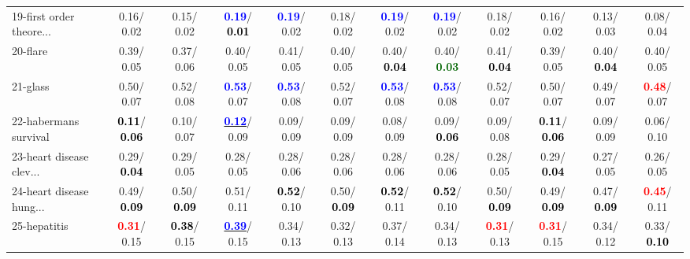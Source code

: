 \begin{table}[h]
\begin{center}
{\begin{tabular}{lc|c|c|c|c|c|c|c|c|c|c}
19-first order theore... &   0.16/  0.02 &   0.15/  0.02 & \textcolor{blue}{\textbf{  0.19}}/\textcolor{black}{\textbf{  0.01}} & \textcolor{blue}{\textbf{  0.19}}/  0.02 &   0.18/  0.02 & \textcolor{blue}{\textbf{  0.19}}/  0.02 & \textcolor{blue}{\textbf{  0.19}}/  0.02 &   0.18/  0.02 &   0.16/  0.02 &   0.13/  0.03 &   0.08/  0.04 \\
20-flare &   0.39/  0.05 &   0.37/  0.06 &   0.40/  0.05 &   0.41/  0.05 &   0.40/  0.05 &   0.40/\textcolor{black}{\textbf{  0.04}} &   0.40/\textcolor{darkgreen}{\textbf{  0.03}} &   0.41/\textcolor{black}{\textbf{  0.04}} &   0.39/  0.05 &   0.40/\textcolor{black}{\textbf{  0.04}} &   0.40/  0.05 \\
21-glass &   0.50/  0.07 &   0.52/  0.08 & \textcolor{blue}{\textbf{  0.53}}/  0.07 & \textcolor{blue}{\textbf{  0.53}}/  0.08 &   0.52/  0.07 & \textcolor{blue}{\textbf{  0.53}}/  0.08 & \textcolor{blue}{\textbf{  0.53}}/  0.08 &   0.52/  0.07 &   0.50/  0.07 &   0.49/  0.07 & \textcolor{red}{\textbf{  0.48}}/  0.07 \\ \hline
22-habermans survival & \textcolor{black}{\textbf{  0.11}}/\textcolor{black}{\textbf{  0.06}} &   0.10/  0.07 & \underline{\textcolor{blue}{\textbf{  0.12}}}/  0.09 &   0.09/  0.09 &   0.09/  0.09 &   0.08/  0.09 &   0.09/\textcolor{black}{\textbf{  0.06}} &   0.09/  0.08 & \textcolor{black}{\textbf{  0.11}}/\textcolor{black}{\textbf{  0.06}} &   0.09/  0.09 &   0.06/  0.10 \\
23-heart disease clev... &   0.29/\textcolor{black}{\textbf{  0.04}} &   0.29/  0.05 &   0.28/  0.05 &   0.28/  0.06 &   0.28/  0.06 &   0.28/  0.06 &   0.28/  0.06 &   0.28/  0.05 &   0.29/\textcolor{black}{\textbf{  0.04}} &   0.27/  0.05 &   0.26/  0.05 \\
24-heart disease hung... &   0.49/\textcolor{black}{\textbf{  0.09}} &   0.50/\textcolor{black}{\textbf{  0.09}} &   0.51/  0.11 & \textcolor{black}{\textbf{  0.52}}/  0.10 &   0.50/\textcolor{black}{\textbf{  0.09}} & \textcolor{black}{\textbf{  0.52}}/  0.11 & \textcolor{black}{\textbf{  0.52}}/  0.10 &   0.50/\textcolor{black}{\textbf{  0.09}} &   0.49/\textcolor{black}{\textbf{  0.09}} &   0.47/\textcolor{black}{\textbf{  0.09}} & \textcolor{red}{\textbf{  0.45}}/  0.11 \\
25-hepatitis & \textcolor{red}{\textbf{  0.31}}/  0.15 & \textcolor{black}{\textbf{  0.38}}/  0.15 & \underline{\textcolor{blue}{\textbf{  0.39}}}/  0.15 &   0.34/  0.13 &   0.32/  0.13 &   0.37/  0.14 &   0.34/  0.13 & \textcolor{red}{\textbf{  0.31}}/  0.13 & \textcolor{red}{\textbf{  0.31}}/  0.15 &   0.34/  0.12 &   0.33/\textcolor{black}{\textbf{  0.10}} \\

\end{tabular}}
\end{center}
\end{table}
